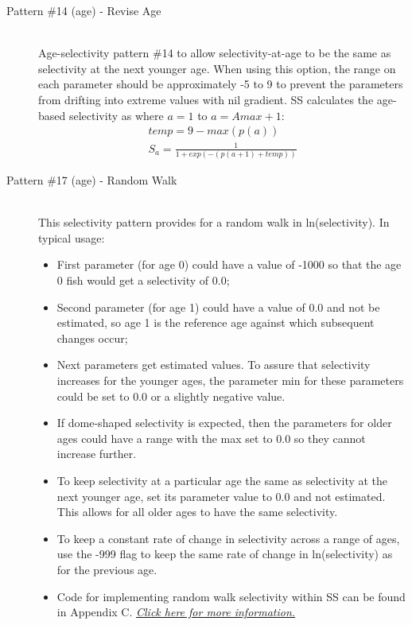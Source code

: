 \begin{description}
	\item[Pattern \#14 (age) - Revise Age]\hfil\\
	Age-selectivity pattern \#14 to allow selectivity-at-age to be the same as selectivity at the next younger age.  When using this option, the range on each parameter should be approximately -5 to 9 to prevent the parameters from drifting into extreme values with nil gradient. SS calculates the age-based selectivity as where $a = 1$ to $a = Amax + 1$:
	\begin{equation}
		 \begin{split}
		 temp = 9 - max(p(a))\\
		S_a = \frac{1}{1+exp(-(p(a+1) + temp))}
		\end{split}
	\end{equation}	
\end{description}

\begin{description}
	\item[Pattern \#17 (age) - Random Walk]\hfill\\
	This selectivity pattern provides for a random walk in ln(selectivity).  In typical usage:
	\begin{itemize}
		\item First parameter (for age 0) could have a value of -1000 so that the age 0 fish would get a selectivity of 0.0;
		\item 	Second parameter (for age 1) could have a value of 0.0 and not be estimated, so age 1 is the reference age against which subsequent changes occur;
		\item 	Next parameters get estimated values.  To assure that selectivity increases for the younger ages, the parameter min for these parameters could be set to 0.0 or a slightly negative value.
		\item If dome-shaped selectivity is expected, then the parameters for older ages could have a range with the max set to 0.0 so they cannot increase further.
		\item To keep selectivity at a particular age the same as selectivity at the next younger age, set its parameter value to 0.0 and not estimated.  This allows for all older ages to have the same selectivity.
		\item 	To keep a constant rate of change in selectivity across a range of ages, use the -999 flag to keep the same rate of change in ln(selectivity) as for the previous age.
		\item  Code for implementing random walk selectivity within SS can be found in Appendix C. \hyperlink{RandWalkSelex}{\textit{Click here for more information.}}
	\end{itemize}
\end{description}

